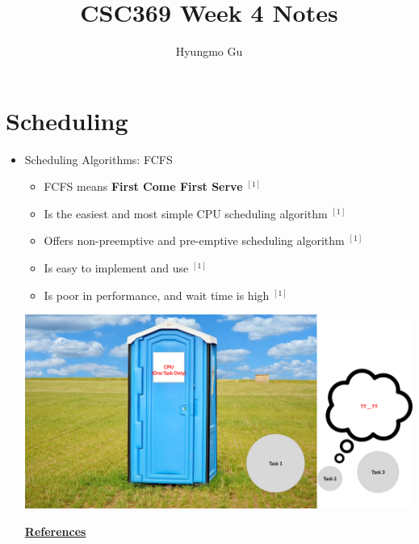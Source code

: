 \documentclass[12pt]{article}
\begin{document}
\title{CSC369 Week 4 Notes}
\author{Hyungmo Gu}
\maketitle

\bigskip

\section{Scheduling}


\begin{itemize}
    \item Scheduling Algorithms: FCFS
    \begin{itemize}
        \item FCFS means \textbf{First Come First Serve} $^{[1]}$
        \item Is the easiest and most simple CPU scheduling algorithm $^{[1]}$
        \item Offers non-preemptive and pre-emptive scheduling algorithm $^{[1]}$
        \item Is easy to implement and use $^{[1]}$
        \item Is poor in performance, and wait time is high $^{[1]}$
    \end{itemize}

    \bigskip

    \begin{center}
    \includegraphics[width=0.8\linewidth]{images/week_4_notes_1_1.png}
    \end{center}

    \underline{\textbf{References}}


\end{itemize}
\end{document}
